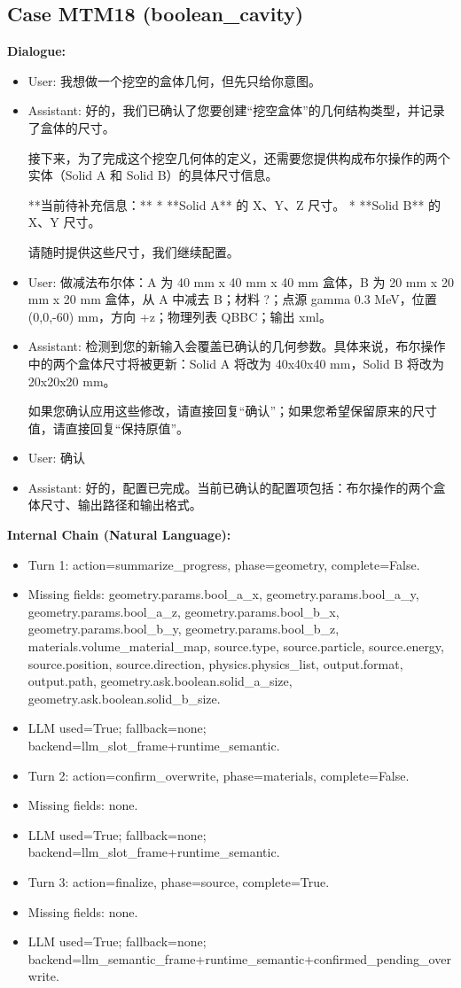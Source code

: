 \documentclass[11pt]{ctexart}
\begin{document}
\subsection{Case MTM18 (boolean\_cavity)}
\textbf{Dialogue:}
\begin{itemize}
\item User: 我想做一个挖空的盒体几何，但先只给你意图。
\item Assistant: 好的，我们已确认了您要创建“挖空盒体”的几何结构类型，并记录了盒体的尺寸。

接下来，为了完成这个挖空几何体的定义，还需要您提供构成布尔操作的两个实体（Solid A 和 Solid B）的具体尺寸信息。

**当前待补充信息：**
*   **Solid A** 的 X、Y、Z 尺寸。
*   **Solid B** 的 X、Y 尺寸。

请随时提供这些尺寸，我们继续配置。
\item User: 做减法布尔体：A 为 40 mm x 40 mm x 40 mm 盒体，B 为 20 mm x 20 mm x 20 mm 盒体，从 A 中减去 B；材料 ?；点源 gamma 0.3 MeV，位置 (0,0,-60) mm，方向 +z；物理列表 QBBC；输出 xml。
\item Assistant: 检测到您的新输入会覆盖已确认的几何参数。具体来说，布尔操作中的两个盒体尺寸将被更新：Solid A 将改为 40x40x40 mm，Solid B 将改为 20x20x20 mm。

如果您确认应用这些修改，请直接回复“确认”；如果您希望保留原来的尺寸值，请直接回复“保持原值”。
\item User: 确认
\item Assistant: 好的，配置已完成。当前已确认的配置项包括：布尔操作的两个盒体尺寸、输出路径和输出格式。
\end{itemize}
\textbf{Internal Chain (Natural Language):}
\begin{itemize}
\item Turn 1: action=summarize\_progress, phase=geometry, complete=False.
\item Missing fields: geometry.params.bool\_a\_x, geometry.params.bool\_a\_y, geometry.params.bool\_a\_z, geometry.params.bool\_b\_x, geometry.params.bool\_b\_y, geometry.params.bool\_b\_z, materials.volume\_material\_map, source.type, source.particle, source.energy, source.position, source.direction, physics.physics\_list, output.format, output.path, geometry.ask.boolean.solid\_a\_size, geometry.ask.boolean.solid\_b\_size.
\item LLM used=True; fallback=none; backend=llm\_slot\_frame+runtime\_semantic.
\item Turn 2: action=confirm\_overwrite, phase=materials, complete=False.
\item Missing fields: none.
\item LLM used=True; fallback=none; backend=llm\_slot\_frame+runtime\_semantic.
\item Turn 3: action=finalize, phase=source, complete=True.
\item Missing fields: none.
\item LLM used=True; fallback=none; backend=llm\_semantic\_frame+runtime\_semantic+confirmed\_pending\_overwrite.
\end{itemize}
\end{document}

